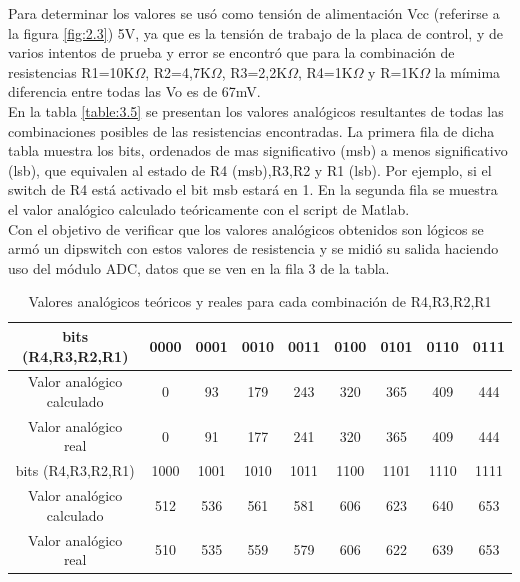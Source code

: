 Para determinar los valores se usó como tensión de alimentación Vcc (referirse a la figura \ref{fig:2.3}) 5V, ya que es la tensión de trabajo de la placa de control, y de varios intentos de prueba y error se encontró que para la combinación de resistencias R1=10K\(\Omega\), R2=4,7K\(\Omega\), R3=2,2K\(\Omega\), R4=1K\(\Omega\) y R=1K\(\Omega\) la mímima diferencia entre todas las Vo es de 67mV.\\
En la tabla \ref{table:3.5} se presentan los valores analógicos resultantes de todas las combinaciones posibles de las resistencias encontradas. La primera fila de dicha tabla muestra los bits, ordenados de mas significativo (msb) a menos significativo (lsb), que equivalen al estado de R4 (msb),R3,R2 y R1 (lsb). Por ejemplo, si el switch de R4 está activado el bit msb estará en 1. En la segunda fila se muestra el valor analógico calculado teóricamente con el script de Matlab.\\
Con el objetivo de verificar que los valores analógicos obtenidos son lógicos se armó un dipswitch con estos valores de resistencia y se midió su salida haciendo uso del módulo ADC, datos que se ven en la fila 3 de la tabla.

\begin{table}[!ht]
	\begin{center}
		\begin{tabular}{|c|c|c|c|c|c|c|c|c|}
			\hline
			\rowcolor{OODlightblue}
			bits (R4,R3,R2,R1) & 0000 & 0001 & 0010 & 0011 & 0100 & 0101 & 0110 & 0111  \\
			\hline
			Valor analógico calculado & 0 & 93 & 179 & 243 & 320 & 365 & 409 & 444 \\
			\hline
			Valor analógico real  & 0 & 91 & 177 & 241 & 320 & 365 & 409 & 444 \\
			\hline \hline
			\rowcolor{OODlightblue}
			bits (R4,R3,R2,R1) & 1000 & 1001 & 1010 & 1011 & 1100 & 1101 & 1110 & 1111  \\
			\hline
			Valor analógico calculado & 512  & 536  & 561  & 581  & 606  & 623  & 640  & 653  \\
			\hline
			Valor analógico real & 510  & 535  & 559  & 579  & 606  & 622  & 639  & 653 \\
			\hline
		\end{tabular}
	\end{center}
	\caption{Valores analógicos teóricos y reales para cada combinación de R4,R3,R2,R1}
	\label{table:\thetable}
\end{table}

\newpage
